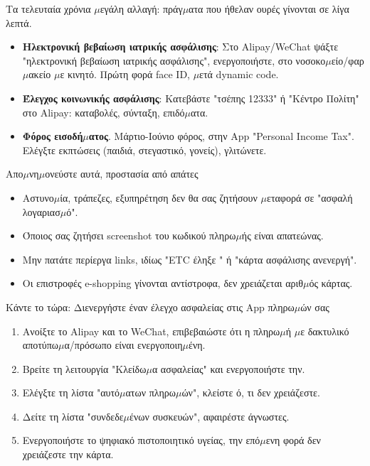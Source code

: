 
Τα τελευταία χρόνια $\mu$εγάλη αλλαγή: πράγ$\mu$ατα που ήθελαν ουρές γίνονται σε λίγα λεπτά.

\begin{itemize}
  \item \textbf{Ηλεκτρονική βεβαίωση ιατρικής ασφάλισης}: Στο Alipay/WeChat ψάξτε "ηλεκτρονική βεβαίωση ιατρικής ασφάλισης", ενεργοποιήστε, στο νοσοκο$\mu$είο/φαρ$\mu$ακείο $\mu$ε κινητό. Πρώτη φορά face ID, $\mu$ετά dynamic code.
  \item \textbf{Έλεγχος κοινωνικής ασφάλισης}: Κατεβάστε "τσέπης 12333" ή "Κέντρο Πολίτη" στο Alipay: καταβολές, σύνταξη, επιδό$\mu$ατα.
  \item \textbf{Φόρος εισοδή$\mu$ατος}. Μάρτιο-Ιούνιο φόρος, στην App "Personal Income Tax". Ελέγξτε εκπτώσεις (παιδιά, στεγαστικό, γονείς), γλιτώνετε.
\end{itemize}

\begin{tcbwarn}{Απο$\mu$νη$\mu$ονεύστε αυτά, προστασία από απάτες}
\begin{itemize}
  \item Αστυνο$\mu$ία, τράπεζες, εξυπηρέτηση δεν θα σας ζητήσουν $\mu$εταφορά σε "ασφαλή λογαριασ$\mu$ό".
  \item Όποιος σας ζητήσει screenshot του κωδικού πληρω$\mu$ής είναι απατεώνας.
  \item Μην πατάτε περίεργα links, ιδίως "ETC έληξε " ή "κάρτα ασφάλισης ανενεργή".
  \item Οι επιστροφές e-shopping γίνονται αντίστροφα, δεν χρειάζεται αριθ$\mu$ός κάρτας.
\end{itemize}

\end{tcbwarn}

\begin{tcbpractice}{Κάντε το τώρα: Διενεργήστε έναν έλεγχο ασφαλείας στις App πληρω$\mu$ών σας}
\begin{enumerate}
  \item Ανοίξτε το Alipay και το WeChat, επιβεβαιώστε ότι η πληρω$\mu$ή $\mu$ε δακτυλικό αποτύπω$\mu$α/πρόσωπο είναι ενεργοποιη$\mu$ένη.
  \item Βρείτε τη λειτουργία "Κλείδω$\mu$α ασφαλείας" και ενεργοποιήστε την.
  \item Ελέγξτε τη λίστα "αυτό$\mu$ατων πληρω$\mu$ών", κλείστε ό, τι δεν χρειάζεστε.
  \item Δείτε τη λίστα "συνδεδε$\mu$ένων συσκευών", αφαιρέστε άγνωστες.
  \item Ενεργοποιήστε το ψηφιακό πιστοποιητικό υγείας, την επό$\mu$ενη φορά δεν χρειάζεστε την κάρτα.
\end{enumerate}

\end{tcbpractice}
